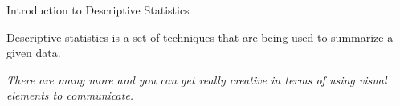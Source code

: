 \documentclass{beamer}
\begin{document}
\begin{frame}{Introduction to Descriptive Statistics}

Descriptive statistics is a set of techniques that are being used to summarize a given data.


\begin{table}[]
\caption{Frequently Used Descriptive Statistics}
\label{tab:my-table}
\end{table}


\begin{center}
\textit{There are many more and you can get really creative in terms of using visual elements to communicate.
}\end{center}

\end{frame}
\end{document}
